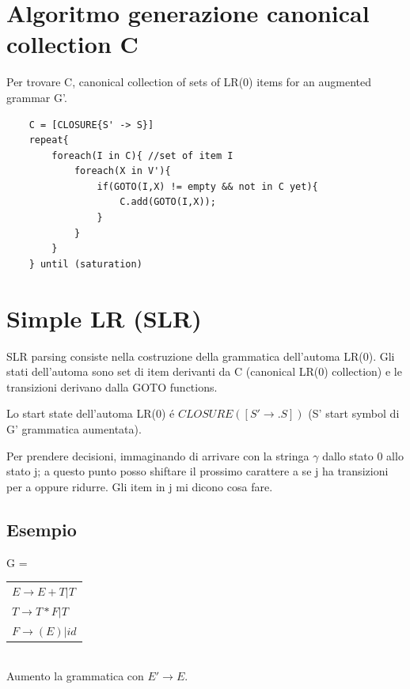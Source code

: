 \section{Algoritmo generazione canonical collection C}

Per trovare C, canonical collection of sets of LR(0) items for an augmented grammar G'.

\begin{lstlisting}
    C = [CLOSURE{S' -> S}]
    repeat{
        foreach(I in C){ //set of item I 
            foreach(X in V'){
                if(GOTO(I,X) != empty && not in C yet){
                    C.add(GOTO(I,X));
                }
            }
        }
    } until (saturation)
\end{lstlisting}

\section{Simple LR (SLR)}
SLR parsing consiste nella costruzione della grammatica dell'automa LR(0). Gli stati dell'automa sono set di item derivanti 
da C (canonical LR(0) collection) e le transizioni derivano dalla GOTO functions.

Lo start state dell'automa LR(0) \'e $CLOSURE({[S' \rightarrow .S]})$ (S' start symbol di G' grammatica aumentata).

Per prendere decisioni, immaginando di arrivare con la stringa $\gamma$ dallo stato 0 allo stato j; a questo punto posso shiftare il 
prossimo carattere a se j ha transizioni per a oppure ridurre. Gli item in j mi dicono cosa fare.

\subsection{Esempio}

G = 
\begin{tabular}{|l}
    $E \rightarrow E + T|T$\\
    $T \rightarrow T * F | T$\\
    $F \rightarrow (E) | id $\\
\end{tabular}\\[10pt]

Aumento la grammatica con $E' \rightarrow E$.\\

